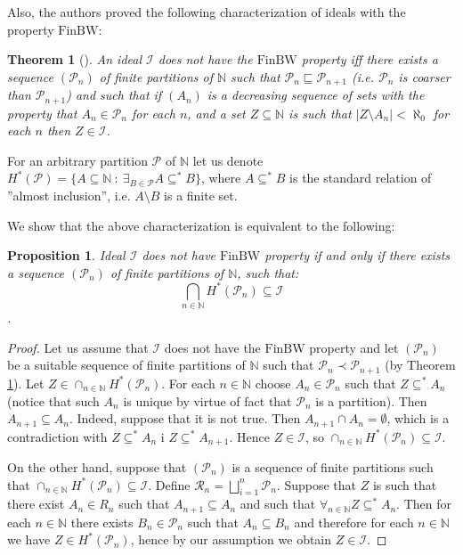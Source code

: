\documentclass{amsart}
\newtheorem{thm}{Theorem}
\newtheorem{prop}{Proposition}
\theoremstyle{definition}
\theoremstyle{definition}
\newcommand{\N}{{\mathbb N}}
\newcommand{\I}{\mathcal I}
\newcommand{\finbw}{\text{FinBW}}
\DeclareMathOperator{\Exists}{\exists}
\begin{document}
Also, the authors \cite{BFMS11} proved 
the following characterization of ideals with the property $\finbw$:
\begin{thm}[\cite{BFMS11}]
\label{tree-fin-bw}
An ideal $\I$ does not have the $\finbw$ property iff there exists a 
sequence $(\mathcal{P}_n)$ of finite partitions of $\N$ such that 
$\mathcal{P}_n \sqsubseteq \mathcal{P}_{n + 1}$
(i.e. $\mathcal{P}_n$ is coarser than $\mathcal{P}_{n + 1}$)
and such that if $(A_n)$ is a decreasing sequence 
of sets with the property that $A_n \in \mathcal{P}_n$ for each $n$, 
and a set $Z\subseteq\N$ is such that $|Z\setminus A_n| < \aleph_0$ 
for each $n$ then $Z\in\I$.
\end{thm}

For an arbitrary partition $\mathcal{P}$ of $\N$ 
let us denote \\$H^{*}(\mathcal{P}) = \{A\subseteq\N\ :\ \Exists_{B\in\mathcal{P}} A\subseteq^{*} B\}$, 
where $A\subseteq^{*} B$ is the standard relation of ''almost inclusion'', i.e. 
$A\setminus B$ is a finite set.

We show that the above characterization is equivalent to the following:

\begin{prop}
Ideal $\I$ does not have $\finbw$ property if and only if there exists a sequence $(\mathcal{P}_n)$ of finite partitions of $\N$, such that: 
$$\bigcap_{n\in\N} H^{*}(\mathcal{P}_n)\subseteq\I$$.
\end{prop}

\begin{proof}
Let us assume that $\I$ does not have the $\finbw$ property and let
$(\mathcal{P}_n)$ be a suitable sequence of finite partitions of $\N$
such that $\mathcal{P}_n \prec \mathcal{P}_{n + 1}$ (by Theorem \ref{tree-fin-bw}). 
Let $Z \in \cap_{n\in\N} H^{*}(\mathcal{P}_n)$. For each $n\in\N$ choose $A_n\in \mathcal{P}_n$
such that $Z \subseteq^* A_n$ (notice that such $A_n$ is unique by virtue of fact that  
$\mathcal{P}_n$ is a partition). Then $A_{n+1} \subseteq A_n$. 
Indeed, suppose that it is not true.
Then $A_{n+1} \cap A_n = \emptyset$, which is a contradiction with $Z \subseteq^* A_n$ i $Z \subseteq^* A_{n + 1}$. 
Hence $Z \in \I$, so $\cap_{n\in\N} H^{*}(\mathcal{P}_n) \subseteq \I$.

On the other hand, suppose that $(\mathcal{P}_n)$ is a sequence 
of finite partitions such that $\cap_{n\in\N} H^{*}(\mathcal{P}_n) \subseteq \I$. 
Define $\mathcal{R}_n = \bigsqcup_{i=1}^n \mathcal{P}_n$. 
Suppose that $Z$ is such that there exist $A_n \in R_n$ such that $A_{n+1} \subseteq A_n$ and such that 
$\forall_{n\in\N} Z \subseteq^* A_n$. Then for each $n\in\N$ there exists $B_n \in \mathcal{P}_n$ 
such that $A_n \subseteq B_n$ and therefore for each $n\in\N$ we have $Z \in H^{*}(\mathcal{P}_n)$, 
hence by our assumption we obtain $Z\in\I$.
\end{proof}
\end{document}
